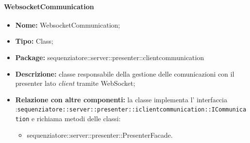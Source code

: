 \paragraph{WebsocketCommunication}
	\begin{itemize}
		\item \textbf{Nome:} WebsocketCommunication;
		\item \textbf{Tipo:} Class;
		\item \textbf{Package:} sequenziatore::server::presenter::clientcommunication
		\item \textbf{Descrizione:} classe responsabile della gestione delle comunicazioni con il presenter lato \textit{client} tramite WebSocket;
		\item \textbf{Relazione con altre componenti:} la classe implementa l' interfaccia :\texttt{sequenziatore::server::presenter::iclientcommunication::ICommunication} e richiama metodi delle classi:
		\begin{itemize}
			\item sequenziatore::server::presenter::PresenterFacade.
		\end{itemize}
	\end{itemize}
